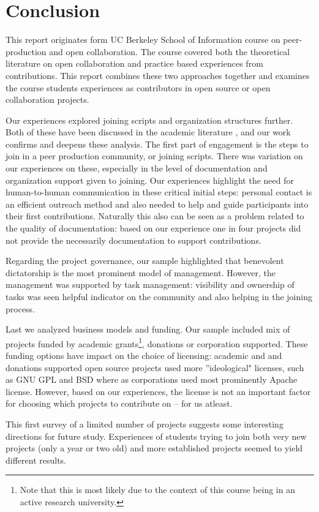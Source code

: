 \section{Conclusion}

This report originates form UC Berkeley School of Information course on peer-production and open collaboration. The course covered both the theoretical literature on open collaboration and practice based experiences from contributions. This report combines these two approaches together and examines the course students experiences as contributors in open source or open collaboration projects.

Our experiences explored joining scripts and organization structures further. Both of these have been discussed in the academic literature \cite{x,y,z}, and our work confirms and deepens these analysis. The first part of engagement is the steps to join in a peer production community, or joining scripts. There was variation on our experiences on these, especially in the level of documentation and organization support given to joining. Our experiences highlight the need for human-to-human communication in these critical initial steps: personal contact is an efficient outreach method and also needed to help and guide participants into their first contributions. Naturally this also can be seen as a problem related to the quality of documentation: based on our experience one in four projects did not provide the necessarily documentation to support contributions.

Regarding the project governance, our sample highlighted that benevolent dictatorship is the most prominent model of management. However, the management was supported by task management: visibility and ownership of tasks was seen helpful indicator on the community and also helping in the joining process.

Last we analyzed business models and funding. Our sample included mix of projects funded by academic grants\footnote{Note that this is most likely due to the context of this course being in an active research university.}, donations or corporation supported. These funding options have impact on the choice of licensing: academic and and donations supported open source projects used more ''ideological" licenses, such as GNU GPL and BSD where as corporations used most prominently Apache license. However, based on our experiences, the license is not an important factor for choosing which projects to contribute on -- for us atleast.

This first survey of a limited number of projects suggests some interesting directions for future study. Experiences of students trying to join both very new projects (only a year or two old) and more established projects seemed to yield different results. 

